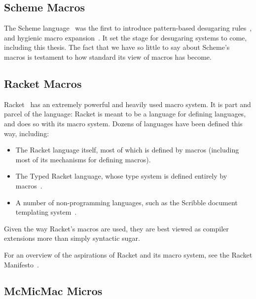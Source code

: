 \subsection{Scheme Macros}

The Scheme language~\cite{scheme5} was the first to introduce pattern-based
desugaring rules~\cite{macro-by-example}, and hygienic macro expansion~\cite{hygienic-macros}. It set
the stage for desugaring systems to come, including this thesis. The
fact that we have so little to say about Scheme's macros is testament
to how standard its view of macros has become.

\subsection{Racket Macros}

Racket~\cite{plt-tr1} has an extremely powerful and heavily used macro
system. It is part and parcel of the language: Racket is meant to be a
language for defining languages, and does so with its macro system.
Dozens of languages have been defined this way, including:
\begin{itemize}
\item The Racket language itself, most of which is defined by macros
  (including most of its mechanisms for defining macros).
\item The Typed Racket language, whose type system is defined entirely
  by macros~\cite{typed-racket}.
\item A number of non-programming languages, such as the Scribble
  document templating system~\cite{scribble}.
\end{itemize}
Given the way Racket's macros are used, they are best viewed as
compiler extensions more than simply syntactic sugar.

For an overview of the aspirations of Racket and its macro system, see
the Racket Manifesto~\cite{racket-manifesto}.


\subsection{McMicMac Micros} \label{sec:taxonomy-mcmicmac}


